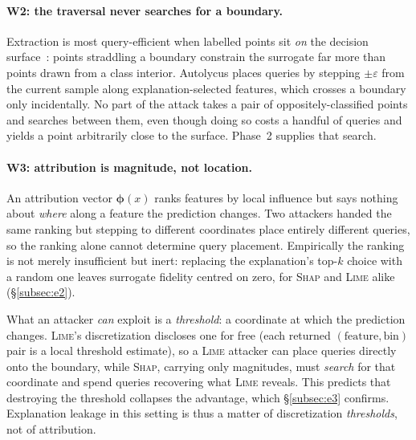 \documentclass[sigconf,anonymous,review]{acmart}
\begin{document}
\paragraph{W2: the traversal never searches for a boundary.}
Extraction is most query-efficient when labelled points sit \emph{on} the decision
surface~\cite{pal2020activethief}: points straddling a boundary constrain the surrogate far more than
points drawn from a class interior. Autolycus places queries by stepping $\pm\varepsilon$ from the
current sample along explanation-selected features, which crosses a boundary only incidentally. No
part of the attack takes a pair of oppositely-classified points and searches between them, even though
doing so costs a handful of queries and yields a point arbitrarily close to the surface. Phase~2
supplies that search.

\paragraph{W3: attribution is magnitude, not location.}
An attribution vector $\bm{\phi}(x)$ ranks features by local influence but says nothing about
\emph{where} along a feature the prediction changes. Two attackers handed the same ranking but
stepping to different coordinates place entirely different queries, so the ranking alone cannot
determine query placement. Empirically the ranking is not merely insufficient but inert: replacing the
explanation's top-$k$ choice with a random one leaves surrogate fidelity centred on zero, for
\textsc{Shap} and \textsc{Lime} alike (\S\ref{subsec:e2}).

What an attacker \emph{can} exploit is a \emph{threshold}: a coordinate at which the prediction
changes. \textsc{Lime}'s discretization discloses one for free (each returned $(\text{feature}, \text{bin})$ pair is a local threshold estimate), so a \textsc{Lime} attacker can
place queries directly onto the boundary, while \textsc{Shap}, carrying only magnitudes, must
\emph{search} for that coordinate and spend queries recovering what \textsc{Lime} reveals. This
predicts that destroying the threshold collapses the advantage, which \S\ref{subsec:e3} confirms.
Explanation leakage in this setting is thus a matter of discretization \emph{thresholds}, not of attribution.
\end{document}

